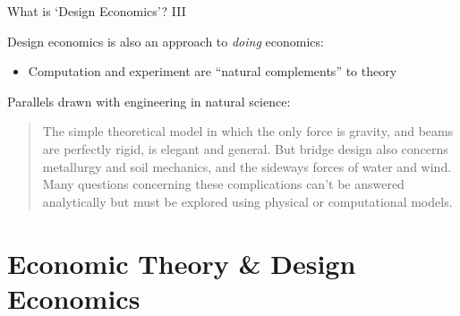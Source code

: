 \documentclass[aspectratio=169,xcolor=dvipsnames]{beamer}
\begin{document}

\begin{frame}{What is `Design Economics'? III}

Design economics is also an approach to \textit{doing} economics:
\begin{itemize}
    \item Computation and experiment are ``natural complements'' \autocite[1363]{roth2002} to theory
\end{itemize}

\vspace{5mm}
Parallels drawn with engineering in natural science:

\vspace{2mm}
\begin{quote}
    The simple theoretical model in which the only force is gravity, and beams are perfectly rigid, is elegant and general. But bridge design also concerns metallurgy and soil mechanics, and the sideways forces of water and wind. Many questions concerning these complications can’t be answered analytically but must be explored using physical or computational models. \autocite[1342]{roth2002}
\end{quote}

\end{frame}










\section{Economic Theory \& Design Economics}
\end{document}
